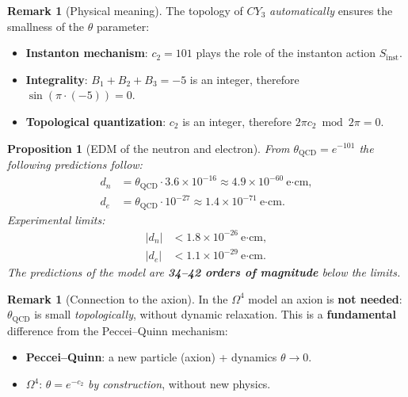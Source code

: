 \documentclass[11pt,a4paper]{article}
\newcommand{\CY}{\ensuremath{CY_3}}
\newcommand{\Om}{\ensuremath{\Omega^4}}
\newtheorem{proposition}[theorem]{Proposition}
\theoremstyle{definition}
\newtheorem{remark}[theorem]{Remark}
\begin{document}
\begin{remark}[Physical meaning]
\label{rem:strong-cp-meaning}
The topology of $\CY$ \emph{automatically} ensures the smallness of the $\theta$ parameter:
\begin{itemize}
    \item \textbf{Instanton mechanism}: $c_2 = 101$ plays the role of the
          instanton action $S_{\text{inst}}$.
    \item \textbf{Integrality}: $B_1 + B_2 + B_3 = -5$ is an integer,
          therefore $\sin(\pi \cdot (-5)) = 0$.
    \item \textbf{Topological quantization}: $c_2$ is an integer, therefore
          $2\pi c_2 \bmod 2\pi = 0$.
\end{itemize}
\end{remark}

\begin{proposition}[EDM of the neutron and electron]
\label{prop:edm-predictions}
From $\theta_{\text{QCD}} = e^{-101}$ the following predictions follow:
\begin{align}
    d_n &= \theta_{\text{QCD}} \cdot 3.6 \times 10^{-16}
        \approx 4.9 \times 10^{-60}~\text{e·cm}, \\
    d_e &= \theta_{\text{QCD}} \cdot 10^{-27}
        \approx 1.4 \times 10^{-71}~\text{e·cm}.
\end{align}
Experimental limits:
\begin{align}
    |d_n| &< 1.8 \times 10^{-26}~\text{e·cm}, \\
    |d_e| &< 1.1 \times 10^{-29}~\text{e·cm}.
\end{align}
The predictions of the model are \textbf{34--42 orders of magnitude} below the limits.
\end{proposition}

\begin{remark}[Connection to the axion]
\label{rem:axion-not-needed}
In the $\Om$ model an axion is \textbf{not needed}: $\theta_{\text{QCD}}$ is small
\emph{topologically}, without dynamic relaxation. This is
a \textbf{fundamental} difference from the Peccei--Quinn mechanism:
\begin{itemize}
    \item \textbf{Peccei--Quinn}: a new particle (axion) +
          dynamics $\theta \to 0$.
    \item \textbf{$\Om$}: $\theta = e^{-c_2}$ \emph{by construction},
          without new physics.
\end{itemize}
\end{remark}
\end{document}
